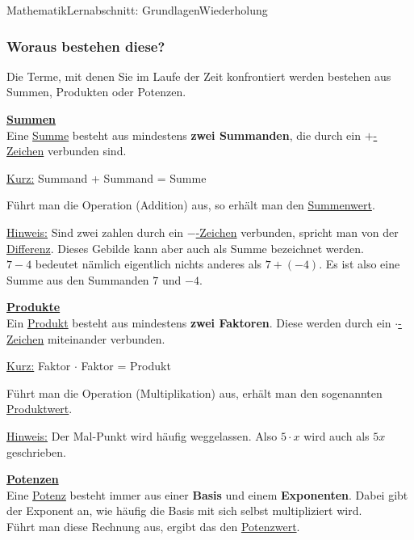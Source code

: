 \documentclass[11pt,twocolumn,oneside,openany,headings=optiontotoc,11pt,numbers=noenddot]{article}
\begin{document}
\begin{worksheet}{Mathematik}{Lernabschnitt: Grundlagen}{Wiederholung}
		\subsubsection*{Woraus bestehen diese?}
		Die Terme, mit denen Sie im Laufe der Zeit konfrontiert werden bestehen aus Summen, Produkten oder Potenzen.\\
		\par\noindent
		\textbf{\underline{Summen}}\\
		Eine \underline{Summe} besteht aus mindestens \textbf{zwei Summanden}, die durch ein \underline{\(+\)-Zeichen} verbunden sind.
		\begin{framed}\noindent
			\underline{Kurz:} Summand + Summand = Summe
		\end{framed}
		\noindent
		Führt man die Operation (Addition) aus, so erhält man den \underline{Summenwert}.\\
		\par\noindent
		\underline{Hinweis:} Sind zwei zahlen durch ein \underline{\glqq{}\(-\)\grqq{}-Zeichen} verbunden, spricht man von der \underline{Differenz}. Dieses Gebilde kann aber auch als Summe bezeichnet werden.\\
		\(7-4\) bedeutet nämlich eigentlich nichts anderes als \(7 + (-4)\). Es ist also eine Summe aus den Summanden \(7\) und \(-4\).\\
		\par\noindent
		\textbf{\underline{Produkte}}\\
		Ein \underline{Produkt} besteht aus mindestens \textbf{zwei Faktoren}. Diese werden durch ein \underline{\glqq{}\(\cdot\)\grqq{}-Zeichen} miteinander verbunden.
		\begin{framed}
			\noindent
			\underline{Kurz:} Faktor $\cdot$ Faktor = Produkt
		\end{framed}
		\noindent
		Führt man die Operation (Multiplikation) aus, erhält man den sogenannten \underline{Produktwert}.\\
		\par\noindent
		\underline{Hinweis:} Der Mal-Punkt wird häufig weggelassen. Also \(5\cdot x\) wird auch als \(5x\) geschrieben.\\
		\par\noindent
		\textbf{\underline{Potenzen}}\\
		Eine \underline{Potenz} besteht immer aus einer \textbf{Basis} und einem \textbf{Exponenten}. Dabei gibt der Exponent an, wie häufig die Basis mit sich selbst multipliziert wird.\\
		Führt man diese Rechnung aus, ergibt das den \underline{Potenzwert}.

\end{worksheet}
\end{document}
